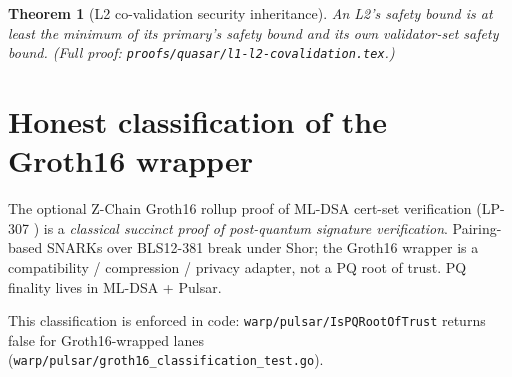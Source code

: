 \documentclass[11pt,a4paper]{article}
\newtheorem{theorem}{Theorem}
\begin{document}
\begin{theorem}[L2 co-validation security inheritance]
\label{thm:l2-covalidation-spec}
An L2's safety bound is at least the minimum of its primary's safety bound and its own validator-set safety bound. (Full proof: \texttt{proofs/quasar/l1-l2-covalidation.tex}.)
\end{theorem}

\section{Honest classification of the Groth16 wrapper}

The optional Z-Chain Groth16 rollup proof of ML-DSA cert-set verification (LP-307 \cite{lp307}) is a \emph{classical succinct proof of post-quantum signature verification}. Pairing-based SNARKs over BLS12-381 break under Shor; the Groth16 wrapper is a compatibility / compression / privacy adapter, not a PQ root of trust. PQ finality lives in ML-DSA + Pulsar.

This classification is enforced in code: \texttt{warp/pulsar/IsPQRootOfTrust} returns false for Groth16-wrapped lanes (\texttt{warp/pulsar/groth16\_classification\_test.go}).



\end{document}
